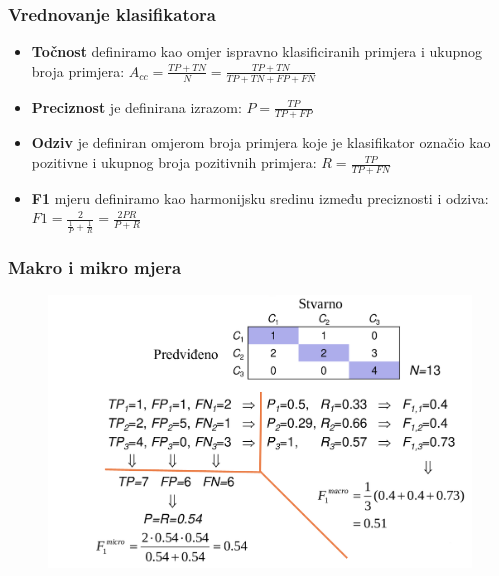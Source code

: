 \documentclass{beamer}
\begin{document}
\begin{frame}[noframenumbering]
	\frametitle{Vrednovanje klasifikatora}
	\begin{itemize}
		\item \textbf{Točnost} definiramo kao omjer ispravno klasificiranih primjera i ukupnog broja primjera:
		$A_{cc} = \frac{TP + TN}{N} = \frac{TP + TN}{TP + TN + FP + FN}$
		\item \textbf{Preciznost} je definirana izrazom: $P = \frac{TP}{TP + FP}$
		\item \textbf{Odziv} je definiran omjerom broja primjera koje je klasifikator označio kao pozitivne i ukupnog broja pozitivnih primjera:
		$R = \frac{TP}{TP + FN}$
		\item \textbf{F1} mjeru definiramo kao harmonijsku sredinu između preciznosti i odziva:
		$F1 = \frac{2}{\frac{1}{P} + \frac{1}{R}} = \frac{2PR}{P + R}$
	\end{itemize}
\end{frame}

\begin{frame}[noframenumbering]
	\frametitle{Makro i mikro mjera}
	\begin{figure}[h]
		\centering
		\includegraphics[scale=0.2]{makro_mikro.png}
	\end{figure}
\end{frame}
\end{document}
